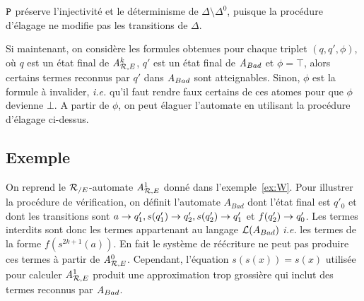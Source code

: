 \begin{remark}
   $\mathtt{P}$ préserve l'injectivité et le déterminisme de $\Delta \setminus \Delta^0$,
   puisque la procédure d'élagage ne modifie pas les transitions de $\Delta$.
 \end{remark}


Si maintenant, on considère les formules obtenues 
pour chaque triplet $(q,q',\phi)$, où $q$ est un état final de
${\mathit A}_{\mathcal R,E}^k$, $q'$ est un état final de $\mathit A_{Bad}$ et $\phi = \top$, alors
certains termes reconnus par $q'$ dans $\mathit A_{Bad}$ sont atteignables.
Sinon, $\phi$ est la formule à invalider, \textit{i.e.} qu'il faut rendre faux
certains de ces atomes pour que $\phi$ devienne $\bot$. A partir de $\phi$, on peut
élaguer l'automate en utilisant la procédure d'élagage ci-dessus.


\subsection{Exemple}
On reprend le ${\mathcal R_{/E}}$-automate ${\mathit A}_{\mathcal R,E}^1$ donné dans l'exemple~\ref{ex:W}.
Pour illustrer la procédure de vérification, on définit l'automate
$A_{Bad}$ dont l'état final est $q'_0$ et dont les transitions sont
 $a\rightarrow q'_1, s(q'_1)\rightarrow q'_2, s(q'_2)\rightarrow q'_1$ et $f(q'_2)\rightarrow q'_0$. 
Les termes interdits sont donc les termes appartenant au langage
$\mathcal{L}(A_{Bad})$ \textit{i.e.} les termes de la forme  $f(s^{2k + 1}(a))$.
En fait le système de réécriture ne peut pas produire ces termes 
à partir de ${\mathit A}_{\mathcal R,E}^0$. Cependant, l'équation $s(s(x))=s(x)$ 
utilisée pour calculer ${\mathit A}_{\mathcal R,E}^1$ produit une approximation trop grossière
qui inclut des termes reconnus par $\mathit A_{Bad}$.

